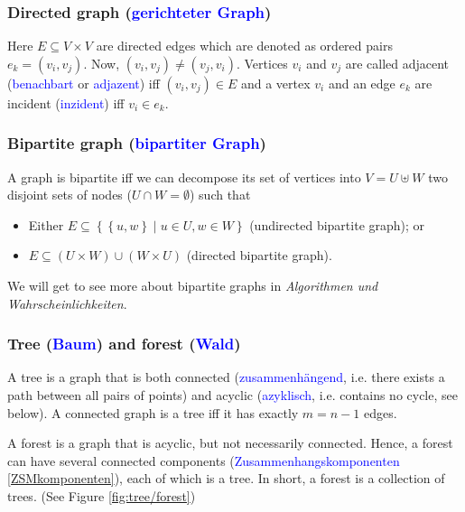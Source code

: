 \documentclass[a4paper]{article}
\begin{document}
\subsubsection{Directed graph (\textcolor{blue}{{gerichteter Graph}})}
Here $E\subseteq V\times V$ are directed edges which are denoted as ordered pairs $e_k=\left(v_i, v_j\right)$. Now, $\left(v_i, v_j\right) \neq \left(v_j, v_i\right)$. Vertices $v_i$ and $v_j$ are called adjacent (\textcolor{blue}{{benachbart}} or \textcolor{blue}{{adjazent}}) iff $\left(v_i, v_j \right) \in E$ and a vertex $v_i$ and an edge $e_k$ are incident (\textcolor{blue}{{inzident}}) iff $v_i \in e_k$.

\subsubsection{Bipartite graph (\textcolor{blue}{{bipartiter Graph}})}
A graph is bipartite iff we can decompose its set of vertices into $V=U\uplus W$ two disjoint sets of nodes ($U \cap W=\emptyset$) such that
\begin{itemize}
\item Either $E\subseteq \left\lbrace \left\lbrace u,w \right\rbrace \mid u\in U, w\in W \right\rbrace$ (undirected bipartite graph); or
\item $E\subseteq (U\times W) \cup (W\times U)$ (directed bipartite graph).
\end{itemize}
We will get to see more about bipartite graphs in \textit{Algorithmen und Wahrscheinlichkeiten}.

\subsubsection{Tree (\textcolor{blue}{{Baum}}) and forest (\textcolor{blue}{{Wald}})}
A tree is a graph that is both connected (\textcolor{blue}{{zusammenhängend}}, i.e. there exists a path between all pairs of points) and acyclic (\textcolor{blue}{{azyklisch}}, i.e. contains no cycle, see below). A connected graph is a tree iff it has exactly $m=n-1$ edges.

A forest is a graph that is acyclic, but not necessarily connected. Hence, a forest can have several connected components (\textcolor{blue}{{Zusammenhangskomponenten}} \ref{ZSMkomponenten}), each of which is a tree. In short, a forest is a collection of trees. (See Figure \ref{fig:tree/forest})
\end{document}
